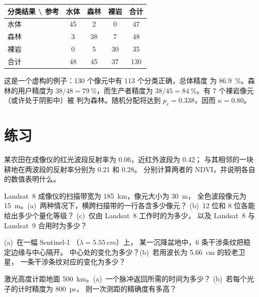 \begin{center}
\small
\begin{tabular}{l|ccc|c}
\hline
分类结果 \textbackslash{} 参考 & 水体 & 森林 & 裸岩 & 合计 \\
\hline
水体 & 45 & 2 & 0 & 47 \\
森林 & 3 & 38 & 7 & 48 \\
裸岩 & 0 & 5 & 30 & 35 \\
\hline
合计 & 48 & 45 & 37 & 130 \\
\hline
\end{tabular}
\end{center}

这是一个虚构的例子：130 个像元中有 113 个分类正确，总体精度
为 \qty{86.9}{\percent}。森林的用户精度为
$38/48 = \qty{79}{\percent}$，而生产者精度为 $38/45 =
\qty{84}{\percent}$。有 7 个裸岩像元（或许处于阴影中）被
判为森林。随机分配将达到 $p_e = 0.338$，因而 $\kappa =
0.80$。

\section{练习}

\begin{exercise}[$\star$]\label{exo:b3:remote-sensing-gis:1}
某农田在成像仪的红光波段反射率为 0.06，近红外波段为 0.42；
与其相邻的一块耕地在两波段的反射率分别为 0.21 和 0.28。
分别计算两者的 NDVI，并说明各自的数值表明什么。
\end{exercise}

\begin{exercise}[$\star$]\label{exo:b3:remote-sensing-gis:2}
Landsat~8 成像仪的扫描带宽为 \qty{185}{km}，像元大小为 \qty{30}{m}，
全色波段像元为 \qty{15}{m}。(a)~两种情况下，横跨扫描带的一行各含多少像元？
(b)~12 位和 8 位各能给出多少个量化等级？
(c)~仅由 Landsat~8 工作时的为多少，
以及 Landsat~8 与 Landsat~9 合用时为多少？
\end{exercise}

\begin{exercise}[$\star$]\label{exo:b3:remote-sensing-gis:3}
(a)~在一幅 Sentinel-1 （$\lambda = \qty{5.55}{cm}$）上，
某一沉降盆地中，6 条干涉条纹把稳定边缘与中心隔开。
中心处的变化为多少？(b)~若用波长为 \qty{5.66}{cm} 的较老卫星，
一条干涉条纹对应的变化为多少？
\end{exercise}

\begin{exercise}[$\star$]\label{exo:b3:remote-sensing-gis:4}
激光高度计距地面 \qty{500}{km}。(a)~一个脉冲返回所需的时间为多少？
(b)~若每个光子的计时精度为 \qty{800}{ps}，
则一次测距的精确度有多高？
\end{exercise}

